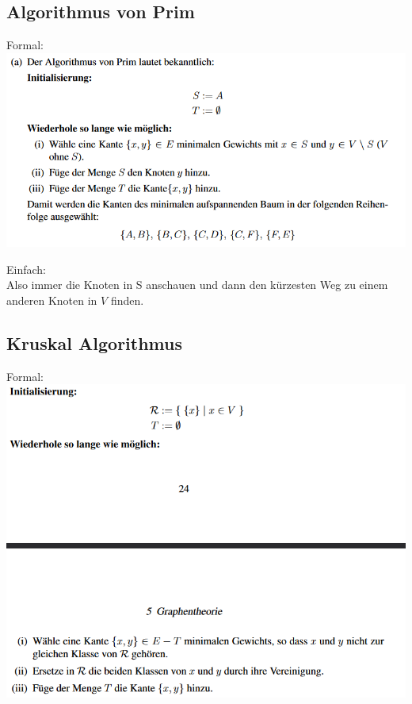 \documentclass[12pt]{scrartcl}
\begin{document}
\newpage
\subsection{Algorithmus von Prim}
Formal:\\

\includegraphics[width=14cm]{img/prim_algorithmus.png}

Einfach:\\
Also immer die Knoten in S anschauen und dann den kürzesten Weg zu einem anderen Knoten in $V$ finden.\\

\newpage
\subsection{Kruskal Algorithmus}
Formal:\\

\includegraphics[width=14cm]{img/kruskal_algorithmus.png}\\
\end{document}
